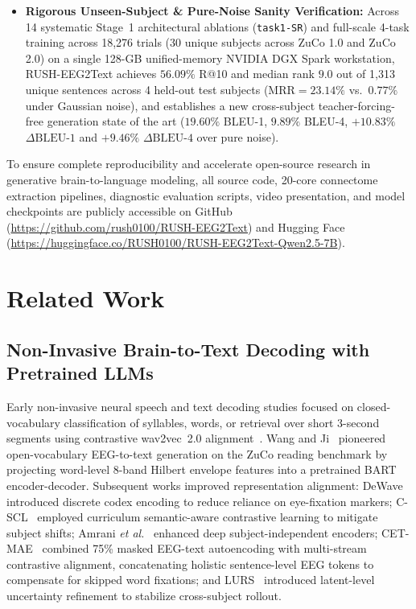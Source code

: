 \documentclass[journal]{IEEEtran}
\begin{document}
\begin{itemize}
    \item \textbf{Rigorous Unseen-Subject \& Pure-Noise Sanity Verification:} Across 14 systematic Stage~1 architectural ablations (\texttt{task1-SR}) and full-scale 4-task training across 18,276 trials (30 unique subjects across ZuCo 1.0 and ZuCo 2.0) on a single 128-GB unified-memory NVIDIA DGX Spark workstation, RUSH-EEG2Text achieves $\mathbf{56.09\%}$ R@10 and median rank $\mathbf{9.0}$ out of 1,313 unique sentences across 4 held-out test subjects ($\text{MRR}=\mathbf{23.14\%}$ vs.\ $0.77\%$ under Gaussian noise), and establishes a new cross-subject teacher-forcing-free generation state of the art ($\mathbf{19.60\%}$ BLEU-1, $\mathbf{9.89\%}$ BLEU-4, $+\mathbf{10.83\%}$ $\Delta\text{BLEU-1}$ and $+\mathbf{9.46\%}$ $\Delta\text{BLEU-4}$ over pure noise).
\end{itemize}

To ensure complete reproducibility and accelerate open-source research in generative brain-to-language modeling, all source code, 20-core connectome extraction pipelines, diagnostic evaluation scripts, video presentation, and model checkpoints are publicly accessible on GitHub (\url{https://github.com/rush0100/RUSH-EEG2Text}) and Hugging Face (\url{https://huggingface.co/RUSH0100/RUSH-EEG2Text-Qwen2.5-7B}).

\section{Related Work}

\subsection{Non-Invasive Brain-to-Text Decoding with Pretrained LLMs}
Early non-invasive neural speech and text decoding studies focused on closed-vocabulary classification of syllables, words, or retrieval over short 3-second segments using contrastive wav2vec~2.0 alignment~\cite{defossez2023decoding}. Wang and Ji~\cite{wang2022open} pioneered open-vocabulary EEG-to-text generation on the ZuCo reading benchmark by projecting word-level 8-band Hilbert envelope features into a pretrained BART encoder-decoder. Subsequent works improved representation alignment: DeWave~\cite{duan2023dewave} introduced discrete codex encoding to reduce reliance on eye-fixation markers; C-SCL~\cite{feng2023cscl} employed curriculum semantic-aware contrastive learning to mitigate subject shifts; Amrani \textit{et al.}~\cite{amrani2024deep} enhanced deep subject-independent encoders; CET-MAE~\cite{wang2024cetmae} combined 75\% masked EEG-text autoencoding with multi-stream contrastive alignment, concatenating holistic sentence-level EEG tokens to compensate for skipped word fixations; and LURS~\cite{park2026lurs} introduced latent-level uncertainty refinement to stabilize cross-subject rollout.
\end{document}
